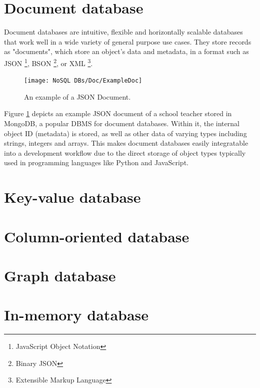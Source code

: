 \documentclass[12pt]{report}
\begin{document}
\section{Document database}
Document databases are intuitive, flexible and horizontally scalable databases that work well in a wide variety of general purpose use cases.
They store records as "documents", which store an object's data and metadata, in a format such as JSON
\footnote{JavaScript Object Notation}, BSON \footnote{Binary JSON}, or XML \footnote{Extensible Markup Language}. 

\begin{figure}[H]
    \centering
    \texttt{[image: NoSQL DBs/Doc/ExampleDoc]}
    \caption{An example of a JSON Document.\label{fig:ExampleDoc}}
\end{figure}

\noindent Figure \ref{fig:ExampleDoc} depicts an example JSON document of a school teacher stored in MongoDB, a popular DBMS
for document databases. Within it, the internal object ID (metadata) is stored, as well as other data of varying types including 
strings, integers and arrays. This makes document databases easily integratable into a development workflow due to the direct 
storage of object types typically used in programming languages like Python and JavaScript.




\section{Key-value database}

\section{Column-oriented database}


\section{Graph database}


\section{In-memory database}
\end{document}
